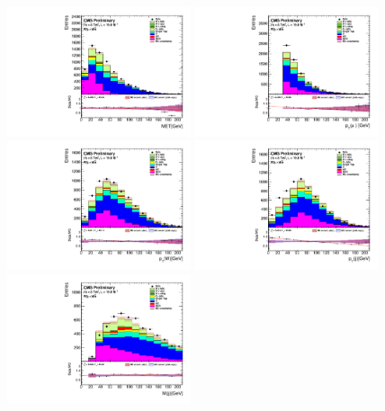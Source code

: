 \begin{figure}[htbp]
	\centering
		\includegraphics[width=0.48\textwidth]{Figures/Results/Electron/prefit/Wbb_GetMET_doQCD1.pdf}
		\includegraphics[width=0.48\textwidth]{Figures/Results/Electron/prefit/Wbb_vLepton_pt_doQCD1.pdf}
		\includegraphics[width=0.48\textwidth]{Figures/Results/Electron/prefit/Wbb_GetWpt_doQCD1.pdf}
		\includegraphics[width=0.48\textwidth]{Figures/Results/Electron/prefit/Wbb_H_pt_doQCD1.pdf}
		\includegraphics[width=0.48\textwidth]{Figures/Results/Electron/prefit/Wbb_H_mass_doQCD1.pdf}

\end{figure}
